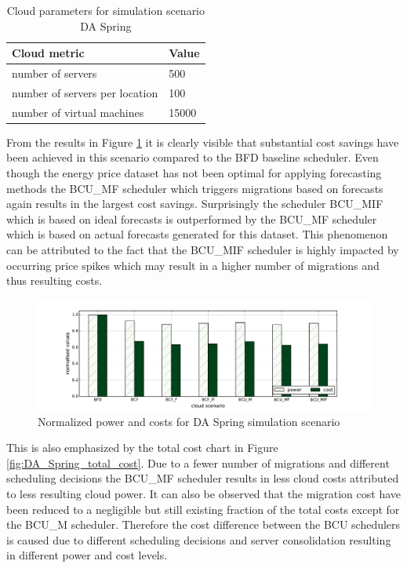\begin{table}[htbp]
\centering
\begin{tabular}[\textwidth]{ll}
\toprule
	Cloud metric & Value  \\
\midrule
	number of servers & 500 \\
	number of servers per location & 100 \\
	number of virtual machines & 15000\\
\bottomrule
\end{tabular}
\caption{Cloud parameters for simulation scenario DA Spring}
\label{tab:da_spring_cloud_parameters}
\end{table}

From the results in Figure \ref{fig:DA_Spring_power_vs_cost} it is clearly visible that substantial cost savings have been achieved in this scenario compared to the BFD baseline scheduler. Even though the energy price dataset has not been optimal for applying forecasting methods the BCU\_MF scheduler which triggers migrations based on forecasts again results in the largest cost savings. Surprisingly the scheduler BCU\_MIF which is based on ideal forecasts is outperformed by the BCU\_MF scheduler which is based on actual forecasts generated for this dataset. This phenomenon can be attributed to the fact that the BCU\_MIF scheduler is highly impacted by occurring price spikes which may result in a higher number of migrations and thus resulting costs. 

\begin{figure}[htbp]
	\centering
		\includegraphics[width=1.00\textwidth]{figures/evaluation_and_results/DA_Spring_power_vs_cost.pdf}
	\caption{Normalized power and costs for DA Spring simulation scenario}
	\label{fig:DA_Spring_power_vs_cost}
\end{figure}

This is also emphasized by the total cost chart in Figure \ref{fig:DA_Spring_total_cost}. Due to a fewer number of migrations and different scheduling decisions the BCU\_MF scheduler results in less cloud costs attributed to less resulting cloud power. It can also be observed that the migration cost have been reduced to a negligible but still existing fraction of the total costs except for the BCU\_M scheduler. Therefore the cost difference between the BCU schedulers is caused due to different scheduling decisions and server consolidation resulting in different power and cost levels.

